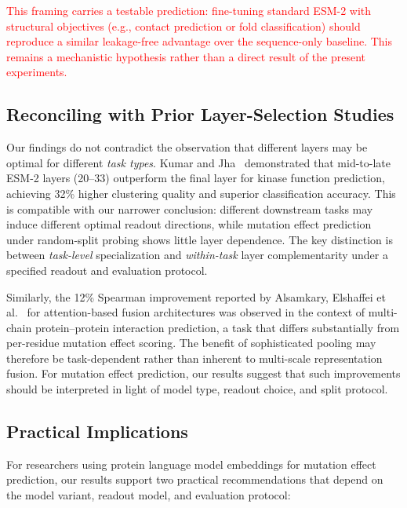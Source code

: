 \documentclass[numbered,webpdf,modern,large]{oup-authoring-template}
\newcommand{\rev}[1]{\textcolor{red}{#1}}
\begin{document}
\rev{This framing carries a testable prediction: fine-tuning standard ESM-2
with structural objectives (e.g., contact prediction or fold classification)
should reproduce a similar leakage-free advantage over the sequence-only baseline.
This remains a mechanistic hypothesis rather than a direct result of the present
experiments.}

\subsection{Reconciling with Prior Layer-Selection Studies}

Our findings do not contradict the observation that different layers may be
optimal for different \emph{task types}. Kumar and Jha~\cite{kumar2025}
demonstrated that mid-to-late ESM-2 layers (20--33) outperform the final layer
for kinase function prediction, achieving 32\% higher clustering quality and
superior classification accuracy. This is compatible with our narrower conclusion:
different downstream tasks may induce different optimal readout directions, while
mutation effect prediction under random-split probing shows little layer dependence.
The key distinction is between \emph{task-level} specialization and
\emph{within-task} layer complementarity under a specified readout and evaluation
protocol.

Similarly, the 12\% Spearman improvement reported by Alsamkary, Elshaffei
et al.~\cite{elshaffei2025} for attention-based fusion architectures was
observed in the context of multi-chain protein--protein interaction prediction,
a task that differs substantially from per-residue mutation effect scoring.
The benefit of sophisticated pooling may therefore be task-dependent rather than
inherent to multi-scale representation fusion. For mutation effect prediction,
our results suggest that such improvements should be interpreted in light of
model type, readout choice, and split protocol.

\subsection{Practical Implications}

For researchers using protein language model embeddings for mutation effect
prediction, our results support two practical recommendations that depend on
the model variant, readout model, and evaluation protocol:
\end{document}
